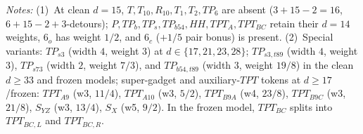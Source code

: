 \documentclass[11pt,reqno]{amsart}
\theoremstyle{plain}
\theoremstyle{definition}
\theoremstyle{remark}
\DeclareRobustCommand{\_}{\ifmmode\text{\textunderscore}\else\textunderscore\allowbreak\fi}
\begin{document}
\begin{table}[t]
\raggedright\footnotesize
\emph{Notes:} (1)~At clean $d = 15$, $T, T_{10}, R_{10}, T_1, T_2, TP_6$ are absent ($3+15-2=16$, $6+15-2+3$-detours); $P, TP_b, TP_s, TP_{b54}, HH, TPT_A, TPT_{BC}$ retain their $d=14$ weights, $6_o$ has weight $1/2$, and $6_c$ ($+1/5$ pair bonus) is present. (2)~Special variants: $TP_{s3}$ (width $4$, weight $3$) at $d \in \{17, 21, 23, 28\}$; $TP_{s3,t89}$ (width $4$, weight $3$), $TP_{s73}$ (width $2$, weight $7/3$), and $TP_{b54,t89}$ (width $3$, weight $19/8$) in the clean $d \ge 33$ and frozen models; super-gadget and auxiliary-$TPT$ tokens at $d \ge 17$/frozen: $TPT_{A9}$ (w3, $11/4$), $TPT_{A10}$ (w3, $5/2$), $TPT_{B9A}$ (w4, $23/8$), $TPT_{B9C}$ (w3, $21/8$), $S_{YZ}$ (w3, $13/4$), $S_X$ (w5, $9/2$). In the frozen model, $TPT_{BC}$ splits into $TPT_{BC,L}$ and $TPT_{BC,R}$.
\end{table}
\end{document}
